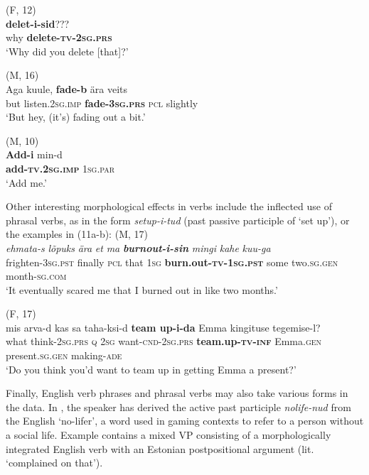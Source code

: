\documentclass[output=paper]{langscibook}
\begin{document}
\ex  (F, 12)\\ \label{ex:vihmanetal:10b}
  \textbf{{delet-i-sid}}???\\
why    \textbf{delete-\textsc{tv-2sg.prs}}\\
\glt ‘Why did you delete [that]?’

\ex  (M, 16)\\ \label{ex:vihmanetal:10c}
\gll Aga  kuule, \textbf{{fade-b}} ära  veits\\
but  listen.2\textsc{sg.imp}   \textbf{fade{}-3}\textbf{\textsc{sg.prs}}  \textsc{pcl}  slightly\\
\glt ‘But hey, (it’s) fading out a bit.’

\ex  (M, 10)\\ \label{ex:vihmanetal:10d}
\gll \textbf{{Add-i}}      min-d\\
\textbf{add{}-}\textbf{\textsc{tv.2sg.imp}}  1\textsc{sg.par}\\
\glt ‘Add me.’
    \z
\z


Other interesting morphological effects in verbs include the inflected use of phrasal verbs, as in the form \textit{setup-i-tud} (past passive participle of ‘set up’), or the examples in (11a-b):
\ea%
    \label{ex:vihmanetal:11}
\ea  (M, 17)\\ \label{ex:vihmanetal:11a}
\gll
\textit{ehmata-s}      \textit{lõpuks}   \textit{ära}   \textit{et}   \textit{ma} \textbf{\textit{burnout-i-sin}}     \textit{mingi}   \textit{kahe}     \textit{kuu-ga}\\
frighten{}-3\textsc{sg.pst}   finally   \textsc{pcl}   that   \textsc{1sg} \textbf{burn.out{}-}\textbf{\textsc{tv}}\textbf{{}-1}\textbf{\textsc{sg.pst}}   some   two.\textsc{sg.gen}   month{}-\textsc{sg.com}\\
\glt ‘It eventually scared me that I burned out in like two months.’

\ex  (F, 17)\\ \label{ex:vihmanetal:11b}
\gll mis  arva-d    kas  sa   taha-ksi-d \textbf{{team} \textbf{up-i-da}  } Emma     kingituse tegemise-l?
\\
what   think{}-2\textsc{sg.prs}   \textsc{q}   2\textsc{sg}  want{}-\textsc{cnd-}2\textsc{sg.prs} \textbf{team.up{}-}\textbf{\textsc{tv-inf}}   Emma\textsc{.gen}   present.\textsc{sg.gen} making{}-\textsc{ade}\\
\glt ‘Do you think you’d want to team up in getting Emma a present?’
    \z
\z



Finally, English verb phrases and phrasal verbs may also take various forms in the data. In , the speaker has derived the active past participle \textit{nolife-nud} from the English ‘no-lifer’, a word used in gaming contexts to refer to a person without a social life. Example  contains a mixed VP consisting of a morphologically integrated English verb with an Estonian postpositional argument (lit. ‘complained on that’).
\end{document}
